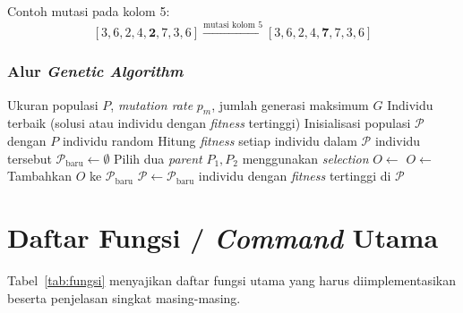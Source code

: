 \documentclass[12pt,a4paper]{article}
\begin{document}
Contoh mutasi pada kolom 5:
\[
    [3, 6, 2, 4, \mathbf{2}, 7, 3, 6] \xrightarrow{\text{mutasi kolom 5}} [3, 6, 2, 4, \mathbf{7}, 7, 3, 6]
\]

\subsubsection{Alur \textit{Genetic Algorithm}}
\label{subsubsec:alur-ga}

\begin{algorithm}[H]
\caption{\textit{Genetic Algorithm} untuk N-Queens}
\label{alg:ga}
\begin{algorithmic}[1]
\Require Ukuran populasi $P$, \textit{mutation rate} $p_m$, jumlah generasi maksimum $G$
\Ensure Individu terbaik (solusi atau individu dengan \textit{fitness} tertinggi)
\State Inisialisasi populasi $\mathcal{P}$ dengan $P$ individu random
    \State Hitung \textit{fitness} setiap individu dalam $\mathcal{P}$
        \State \Return individu tersebut 
    \EndIf
    \State $\mathcal{P}_{\text{baru}} \leftarrow \emptyset$
        \State Pilih dua \textit{parent} $P_1, P_2$ menggunakan \textit{selection}
        \State $O \leftarrow$ 
            \State $O \leftarrow$ 
        \EndIf
        \State Tambahkan $O$ ke $\mathcal{P}_{\text{baru}}$
    \EndWhile
    \State $\mathcal{P} \leftarrow \mathcal{P}_{\text{baru}}$
\EndFor
\State \Return individu dengan \textit{fitness} tertinggi di $\mathcal{P}$
\end{algorithmic}
\end{algorithm}




\section{Daftar Fungsi / \textit{Command} Utama}
\label{sec:daftar-fungsi}

Tabel~\ref{tab:fungsi} menyajikan daftar fungsi utama yang harus diimplementasikan beserta penjelasan singkat masing-masing.
\end{document}

